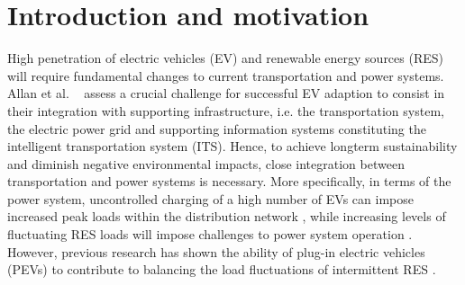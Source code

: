 \section{Introduction and motivation}



High penetration of electric vehicles (EV) and renewable energy sources (RES) will require fundamental changes to current transportation and power systems. 
Allan et al. ~\cite{allan2015benchmark} assess a crucial challenge for successful EV adaption to consist in their integration with supporting infrastructure, i.e. the transportation system, the electric power grid and supporting information systems constituting the intelligent transportation system (ITS). Hence, to achieve longterm sustainability and diminish negative environmental impacts, close integration between transportation and power systems is necessary.
More specifically, in terms of the power system, uncontrolled charging of a high number of EVs can impose increased peak loads within the distribution network \cite{lopes2009identifying}, while increasing levels of fluctuating RES loads will impose challenges to power system operation \cite{heussen2012unified}. 
However, previous research has shown the ability of plug-in electric vehicles (PEVs) to contribute to balancing the load fluctuations of intermittent RES \cite{dallinger2012grid}. 

